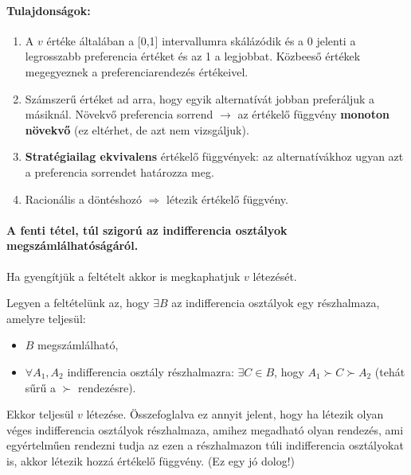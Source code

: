 \documentclass[a4paper,12pt]{article}
\begin{document}
\paragraph{Tulajdonságok:}

\begin{enumerate}

\item A $v$ értéke általában a [0,1] intervallumra skálázódik és a 0 jelenti a legrosszabb preferencia értéket és az 1 a legjobbat. Közbeeső értékek megegyeznek a preferenciarendezés értékeivel.

\item Számszerű értéket ad arra, hogy egyik alternatívát jobban preferáljuk a másiknál. Növekvő preferencia sorrend $\rightarrow$ az értékelő függvény \textbf{monoton növekvő} (ez eltérhet, de azt nem vizsgáljuk).

\item \textbf{Stratégiailag ekvivalens} értékelő függvények: az alternatívákhoz ugyan azt a preferencia sorrendet határozza meg.


\item Racionális a döntéshozó $\Rightarrow$ létezik értékelő függvény.

\end{enumerate}


\paragraph{A fenti tétel, túl szigorú az indifferencia osztályok megszámlálhatóságáról.}

Ha gyengítjük a feltételt akkor is megkaphatjuk $v$ létezését.

Legyen a feltételünk az, hogy $\exists B$ az indifferencia osztályok egy részhalmaza, amelyre teljesül:
\begin{itemize}
\item $B$ megszámlálható,
\item $\forall A_1, A_2$ indifferencia osztály részhalmazra: $\exists C \in B$, hogy $A_1 \succ C \succ A_2$ (tehát sűrű a $\succ$ rendezésre). 
\end{itemize}
Ekkor teljesül $v$ létezése. Összefoglalva ez annyit jelent, hogy ha létezik olyan véges indifferencia osztályok részhalmaza, amihez megadható olyan rendezés, ami egyértelműen rendezni tudja az ezen a részhalmazon túli indifferencia osztályokat is, akkor létezik hozzá értékelő függvény. (Ez egy jó dolog!)
\end{document}
